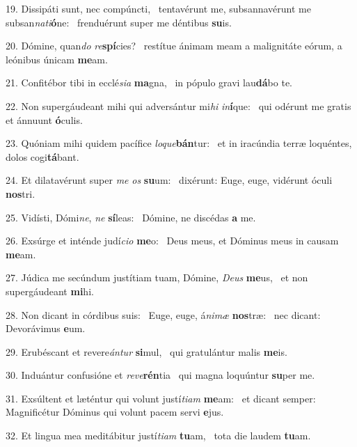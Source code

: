 19. Dissipáti sunt, nec compúncti, \dag\  tentavérunt me, subsannavérunt me subsan\textit{na}\textit{ti}\textbf{ó}ne: \ast\  frenduérunt super me déntibus \textbf{su}is.\

20. Dómine, quan\textit{do} \textit{re}\textbf{spí}cies? \ast\  restítue ánimam meam a malignitáte eórum, a leónibus únicam \textbf{me}am.\

21. Confitébor tibi in ecclé\textit{si}\textit{a} \textbf{ma}gna, \ast\  in pópulo gravi lau\textbf{dá}bo te.\

22. Non supergáudeant mihi qui adversántur mi\textit{hi} \textit{in}\textbf{í}que: \ast\  qui odérunt me gratis et ánnuunt \textbf{ó}culis.\

23. Quóniam mihi quidem pacífice \textit{lo}\textit{que}\textbf{bán}tur: \ast\  et in iracúndia terræ loquéntes, dolos cogi\textbf{tá}bant.\

24. Et dilatavérunt super \textit{me} \textit{os} \textbf{su}um: \ast\  dixérunt: Euge, euge, vidérunt óculi \textbf{nos}tri.\

25. Vidísti, Dómi\textit{ne}, \textit{ne} \textbf{sí}leas: \ast\  Dómine, ne discédas \textbf{a} me.\

26. Exsúrge et inténde judí\textit{ci}\textit{o} \textbf{me}o: \ast\  Deus meus, et Dóminus meus in causam \textbf{me}am.\

27. Júdica me secúndum justítiam tuam, Dómine, \textit{De}\textit{us} \textbf{me}us, \ast\  et non supergáudeant \textbf{mi}hi.\

28. Non dicant in córdibus suis: \dag\  Euge, euge, á\textit{ni}\textit{mæ} \textbf{nos}træ: \ast\  nec dicant: Devorávimus \textbf{e}um.\

29. Erubéscant et revere\textit{án}\textit{tur} \textbf{si}mul, \ast\  qui gratulántur malis \textbf{me}is.\

30. Induántur confusióne et \textit{re}\textit{ve}\textbf{rén}tia \ast\  qui magna loquúntur \textbf{su}per me.\

31. Exsúltent et læténtur qui volunt justí\textit{ti}\textit{am} \textbf{me}am: \ast\  et dicant semper: Magnificétur Dóminus qui volunt pacem servi \textbf{e}jus.\

32. Et lingua mea meditábitur justí\textit{ti}\textit{am} \textbf{tu}am, \ast\  tota die laudem \textbf{tu}am.\

